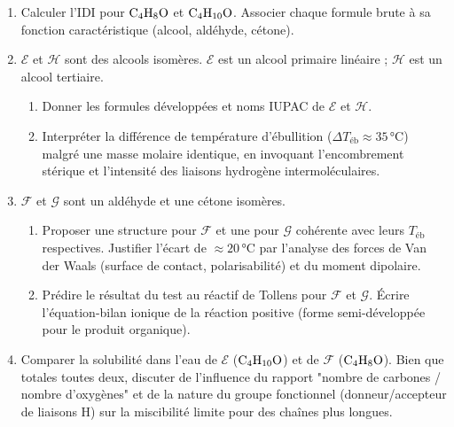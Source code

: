 \documentclass[11pt]{article}
\begin{document}
\begin{exercice}
\begin{enumerate}
    \item Calculer l'IDI pour $\ce{C4H8O}$ et $\ce{C4H10O}$. Associer chaque formule brute à sa fonction caractéristique (alcool, aldéhyde, cétone).
    \item $\mathcal{E}$ et $\mathcal{H}$ sont des alcools isomères. $\mathcal{E}$ est un alcool primaire linéaire ; $\mathcal{H}$ est un alcool tertiaire.
    \begin{enumerate}
        \item Donner les formules développées et noms IUPAC de $\mathcal{E}$ et $\mathcal{H}$.
        \item Interpréter la différence de température d'ébullition ($\Delta T_{\text{éb}} \approx 35\,\si{\celsius}$) malgré une masse molaire identique, en invoquant l'encombrement stérique et l'intensité des liaisons hydrogène intermoléculaires.
    \end{enumerate}
    \item $\mathcal{F}$ et $\mathcal{G}$ sont un aldéhyde et une cétone isomères.
    \begin{enumerate}
        \item Proposer une structure pour $\mathcal{F}$ et une pour $\mathcal{G}$ cohérente avec leurs $T_{\text{éb}}$ respectives. Justifier l'écart de $\approx 20\,\si{\celsius}$ par l'analyse des forces de Van der Waals (surface de contact, polarisabilité) et du moment dipolaire.
        \item Prédire le résultat du test au réactif de Tollens pour $\mathcal{F}$ et $\mathcal{G}$. Écrire l'équation-bilan ionique de la réaction positive (forme semi-développée pour le produit organique).
    \end{enumerate}
    \item Comparer la solubilité dans l'eau de $\mathcal{E}$ ($\ce{C4H10O}$) et de $\mathcal{F}$ ($\ce{C4H8O}$). Bien que totales toutes deux, discuter de l'influence du rapport "nombre de carbones / nombre d'oxygènes" et de la nature du groupe fonctionnel (donneur/accepteur de liaisons H) sur la miscibilité limite pour des chaînes plus longues.
\end{enumerate}
\end{exercice}
\end{document}
